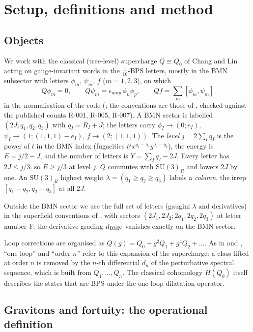\documentclass[11pt]{article}
\newcommand{\file}[1]{\path{#1}}
\newcommand{\R}[1]{\textsf{R-0#1}}
\newcommand{\SU}{\mathrm{SU}}
\newcommand{\ph}{\phi}
\newcommand{\ps}{\psi}
\newcommand{\ff}{f}
\begin{document}
\section{Setup, definitions and method}\label{sec:method}

\subsection{Objects}\label{sec:setup}

We work with the classical (tree-level) supercharge $Q\equiv Q_0$ of Chang and Lin \cite{CLWords} acting on
gauge-invariant words in the $\frac1{16}$-BPS letters, mostly in the BMN subsector with letters $\ph_m$, $\ps_m$, $\ff$
($m=1,2,3$), on which
\begin{equation}
Q\ph_m=0,\qquad Q\ps_m=\epsilon_{mnp}\,\ph_n\ph_p,\qquad Q\ff=\textstyle\sum_m[\ph_m,\ps_m]
\end{equation}
in the normalisation of the code (\file{code/fortuity/bmn/words.py}; the conventions are those of
\cite{CLWords,CCKLL}, checked against the published counts \R{01}, \R{05}, \R{07}). A BMN sector is labelled
$(2J;q_1,q_2,q_3)$ with $q_I=R_I+J$; the letters carry $\ph_I\to(0;e_I)$, $\ps_I\to(1;(1,1,1)-e_I)$,
$\ff\to(2;(1,1,1))$. The \emph{level} $j=2\sum_Iq_I$ is the power of $t$ in the BMN index (fugacities
$t^jx^{q_1-q_3}y^{q_3-q_2}$), the energy is $E=j/2-J$, and the number of letters is $Y=\sum_Iq_I-2J$. Every letter has
$2J\le j/3$, so $E\ge j/3$ at level $j$. $Q$ commutes with $\SU(3)_R$ and lowers $2J$ by one. An $\SU(3)_R$ highest
weight $\lambda=(q_1\ge q_2\ge q_3)$ labels a \emph{column}, the irrep $[q_1-q_2,q_2-q_3]$ at all $2J$.

Outside the BMN sector we use the full set of letters (gaugini $\lambda$ and derivatives) in the superfield
conventions of \cite{CLWords,BK}, with sectors $(2J_1,2J_2;2q_1,2q_2,2q_3)$ at letter number $Y$; the derivative
grading $d_{\rm BMN}$ vanishes exactly on the BMN sector.

Loop corrections are organised as $Q(g)=Q_0+g^2Q_1+g^4Q_2+\dots$. As in \cite{ChoiLee,KKLP} and \cite[footnote~2]{KVM}, ``one loop'' and
``order $n$'' refer to this expansion of the supercharge: a class lifted at order $n$ is removed by the $n$-th
differential $d_n$ of the perturbative spectral sequence, which is built from $Q_1,\dots,Q_n$. The classical
cohomology $H(Q_0)$ itself describes the states that are BPS under the one-loop dilatation operator.

\subsection{Gravitons and fortuity: the operational definition}
\end{document}
